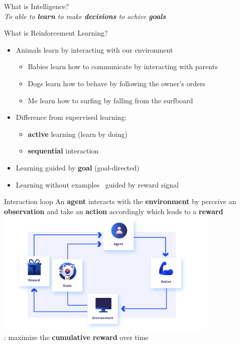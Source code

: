 \documentclass[presentation, 9pt]{beamer}\mode<presentation>{\usetheme{AMSBolognaFC}}
\begin{document}
\begin{frame}[plain,c]
	\begin{center}
	\Huge What is Intelligence?
	\\
	\huge \emph{To able to \textbf{learn} to make \textbf{decisions} to achive \textbf{goals}}
	\end{center}
\end{frame}
\begin{frame}{What is Reinforcement Learning?}
\begin{itemize}
	\item Animals learn by interacting with our environment
	\begin{itemize}
		\item Babies learn how to communicate by interacting with parents
		\item Dogs learn how to behave by following the owner's orders
		\item Me learn how to surfing by falling from the surfboard
	\end{itemize}
	\item Difference from supervised learning:
	\begin{itemize}
		\item \textbf{active} learning (learn by doing)
		\item \textbf{sequential} interaction 
	\end{itemize}
	\item Learning guided by \textbf{goal} (goal-directed)
	\item Learning without examples \faArrowRight \, guided by reward signal
\end{itemize}
\end{frame}

\begin{frame}{Interaction loop}
\centering
\Large An \textbf{agent} interacts with the \textbf{environment} by perceive an \textbf{observation} and take an \textbf{action} accordingly which leads to a \textbf{reward}
\\
\includegraphics[height=6cm]{img/interaction-loop.png}
\\
\Large
{}: maximize the \textbf{cumulative reward} over time
\end{frame}
\end{document}
